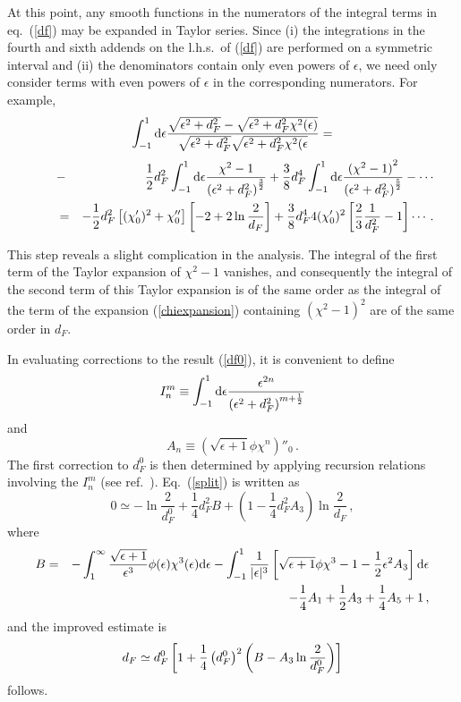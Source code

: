 At this point, any smooth functions in the numerators of the integral
terms in eq.~(\ref{df}) may be expanded in Taylor series.  Since
(i) the integrations in the fourth and sixth addends on the l.h.s.\
of (\ref{df}) are performed on a symmetric interval and (ii) the
denominators contain only even powers of $\epsilon$, we need only
consider terms with even powers of $\epsilon$ in the corresponding
numerators.  For example,
\begin{equation}
\int^1_{-1}{\rm d}\epsilon
   \frac{\sqrt{\epsilon^2 + d^2_F} - \sqrt{\epsilon^2 + d^2_F\chi^2(\epsilon)}}
   {\sqrt{\epsilon^2 + d^2_F}\sqrt{\epsilon^2 + d^2_F\chi^2(\epsilon}}  =
\end{equation}
\begin{eqnarray}
&\qquad-& \frac12 d^2_F \int^1_{-1}{\rm d}\epsilon
		\frac{\chi^2 - 1}{{(\epsilon^2 + d^2_F)}^\frac32}
+ \frac38 d^4_F \int^1_{-1}{\rm d}\epsilon
	\frac{{(\chi^2 - 1)}^2}{{(\epsilon^2 + d^2_F)}^\frac52}
		- \cdots  \nonumber \\
&\qquad=&
-\frac12 d^2_F \left[(\chi'_0)^2 + \chi''_0\right]
	\left[-2 + 2 \ln\frac2{d_F}\right]
+ \frac38 d^4_F 4 (\chi'_0)^2 \left[\frac23\frac1{d^2_F} - 1\right] \cdots
\, \nonumber .
\end{eqnarray}

This step reveals a slight complication in the analysis. The integral
of the first term of the Taylor expansion of $\chi^2-1$ vanishes,
and consequently the integral of the second term of this Taylor expansion
is of the same order as the integral of the term of the
expansion (\ref{chiexpansion}) containing ${(\chi^2 - 1)}^2$
are of the same order in $d_F$.

In evaluating corrections to the result (\ref{df0}), it is convenient 
to define
\begin{equation}
I^m_n \equiv \int^1_{-1}{\rm d}\epsilon \frac{\epsilon^{2n}}
	{{(\epsilon^2 + d^2_F)}^{m+\frac12}}
\end{equation}
and
\begin{equation}
A_n \equiv (\sqrt{\epsilon+1} \phi\chi^n)''_0 \, .
\end{equation}
The first correction to $d^0_F$ is then determined by
applying recursion relations involving the $I^m_n$
(see ref.~\cite{vvkthesis}).  Eq.~(\ref{split}) is written
as
\begin{equation}
0 \simeq -\ln \frac2{d^0_F} + \frac14 d^2_F B +
	\left( 1 - \frac14 d^2_F A_3 \right) \ln \frac2{d_F} \, ,
\end{equation}
where
\begin{eqnarray}
B &=& -\int^\infty_1 \frac{\sqrt{\epsilon+1}}{\epsilon^3}
          \phi(\epsilon)\chi^3(\epsilon){\rm d}\epsilon
      -\int^1_{-1} \frac{1}{|\epsilon|^3}
         \left[ \sqrt{\epsilon+1} \phi\chi^3 -1 -
               \frac12 \epsilon^2  A_3 \right] {\rm d}\epsilon \nonumber \\
 &\quad& -\frac14 A_1 +\frac12 A_3 + \frac14 A_5 +1 \, ,
\end{eqnarray}
and the improved estimate is
\begin{equation}
d_F \simeq d^0_F \left[1 + \frac14 \left(d_F^0\right)^2
	\left(B - A_3 \ln{2\over d_F^0}\right)	\right]
\end{equation}
follows.

